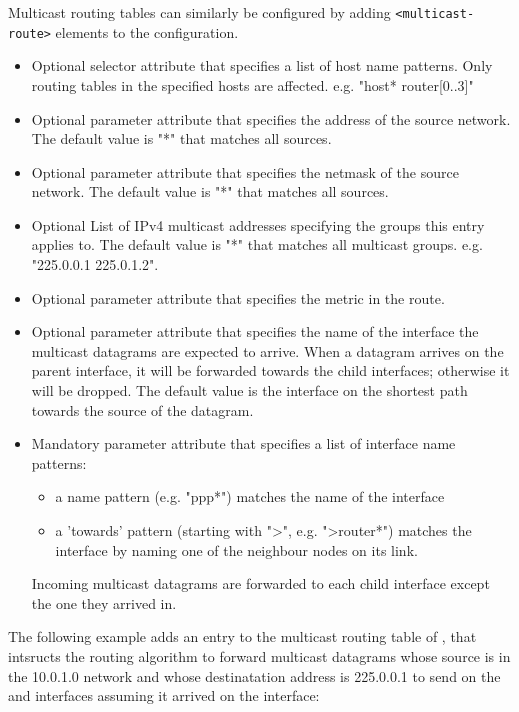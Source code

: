 Multicast routing tables can similarly be configured by adding
\verb!<multicast-route>! elements to the configuration.
\begin{itemize}
    \item {}
      Optional selector attribute that specifies a list of host name patterns.
      Only routing tables in the specified hosts are affected.
      e.g. "host* router[0..3]"
    \item {}
      Optional parameter attribute that specifies the address of the source
      network. The default value is "*" that matches all sources.
    \item {}
      Optional parameter attribute that specifies the netmask of the source
      network. The default value is "*" that matches all sources.
    \item {}
      Optional List of IPv4 multicast addresses specifying the groups this entry
      applies to. The default value is "*" that matches all multicast groups.
      e.g. "225.0.0.1 225.0.1.2".
    \item {}
      Optional parameter attribute that specifies the metric in the route.
    \item {}
      Optional parameter attribute that specifies the name of the interface
      the multicast datagrams are expected to arrive. When a datagram arrives
      on the parent interface, it will be forwarded towards the child interfaces;
      otherwise it will be dropped. The default value is the interface on the
      shortest path towards the source of the datagram.
    \item {}
      Mandatory parameter attribute that specifies a list of interface name
      patterns:
      \begin{itemize}
        \item a name pattern (e.g. "ppp*") matches the name of the interface
        \item a 'towards' pattern (starting with ">", e.g. ">router*") matches the interface
         by naming one of the neighbour nodes on its link.
      \end{itemize}
      Incoming multicast datagrams are forwarded to each child interface except the
      one they arrived in.
\end{itemize}

The following example adds an entry to the multicast routing table of ,
that intsructs the routing algorithm to forward multicast datagrams whose source
is in the 10.0.1.0 network and whose destinatation address is 225.0.0.1 to
send on the  and  interfaces assuming it arrived on the
 interface:

